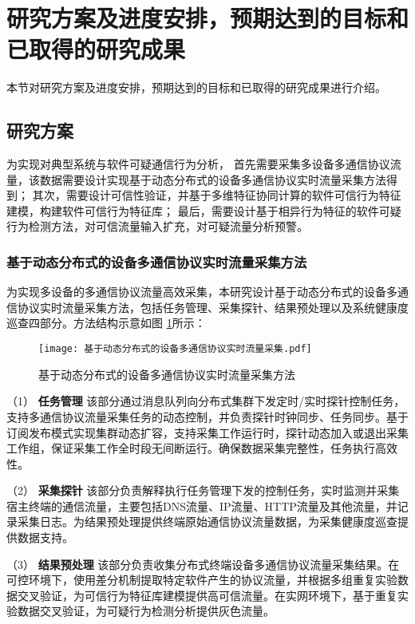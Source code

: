 
\section{研究方案及进度安排，预期达到的目标和已取得的研究成果}
本节对研究方案及进度安排，预期达到的目标和已取得的研究成果进行介绍。
\subsection{研究方案}

为实现对典型系统与软件可疑通信行为分析，
首先需要采集多设备多通信协议流量，该数据需要设计实现基于动态分布式的设备多通信协议实时流量采集方法得到；
其次，需要设计可信性验证，并基于多维特征协同计算的软件可信行为特征建模，构建软件可信行为特征库；
最后，需要设计基于相异行为特征的软件可疑行为检测方法，对可信流量输入扩充，对可疑流量分析预警。


\subsubsection{基于动态分布式的设备多通信协议实时流量采集方法}

为实现多设备的多通信协议流量高效采集，本研究设计基于动态分布式的设备多通信协议实时流量采集方法，包括任务管理、采集探针、结果预处理以及系统健康度巡查四部分。方法结构示意如图 \ref{fig:基于动态分布式的设备多通信协议实时流量采集方法}所示：
\FloatBarrier
 
\begin{figure}[ht]
  \centering
  \texttt{[image: 基于动态分布式的设备多通信协议实时流量采集.pdf]}
  \caption{基于动态分布式的设备多通信协议实时流量采集方法}
  \label{fig:基于动态分布式的设备多通信协议实时流量采集方法}
\end{figure} 

\FloatBarrier

（1） \textbf{任务管理}\quad
该部分通过消息队列向分布式集群下发定时/实时探针控制任务，支持多通信协议流量采集任务的动态控制，并负责探针时钟同步、任务同步。基于订阅发布模式实现集群动态扩容，支持采集工作运行时，探针动态加入或退出采集工作组，保证采集工作全时段无间断运行。确保数据采集完整性，任务执行高效性。

（2） \textbf{采集探针}\quad
该部分负责解释执行任务管理下发的控制任务，实时监测并采集宿主终端的通信流量，主要包括DNS流量、IP流量、HTTP流量及其他流量，并记录采集日志。为结果预处理提供终端原始通信协议流量数据，为采集健康度巡查提供数据支持。

（3） \textbf{结果预处理}\quad
该部分负责收集分布式终端设备多通信协议流量采集结果。在可控环境下，使用差分机制提取特定软件产生的协议流量，并根据多组重复实验数据交叉验证，为可信行为特征库建模提供高可信流量。在实网环境下，基于重复实验数据交叉验证，为可疑行为检测分析提供灰色流量。

